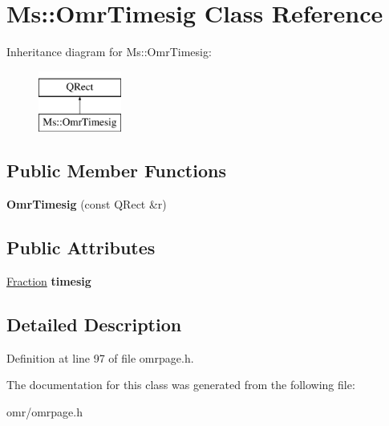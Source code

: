 \hypertarget{class_ms_1_1_omr_timesig}{}\section{Ms\+:\+:Omr\+Timesig Class Reference}
\label{class_ms_1_1_omr_timesig}
Inheritance diagram for Ms\+:\+:Omr\+Timesig\+:\begin{figure}[H]
\begin{center}
\leavevmode
\includegraphics[height=2.000000cm]{class_ms_1_1_omr_timesig}
\end{center}
\end{figure}
\subsection*{Public Member Functions}
\begin{DoxyCompactItemize}
\item 
\mbox{\label{class_ms_1_1_omr_timesig_a585056375ef320b97d6d93a4d5fec909}} 
{\bfseries Omr\+Timesig} (const Q\+Rect \&r)
\end{DoxyCompactItemize}
\subsection*{Public Attributes}
\begin{DoxyCompactItemize}
\item 
\mbox{\label{class_ms_1_1_omr_timesig_a6c6b1c6de252f75c70b98b9520ebb234}} 
\hyperlink{class_ms_1_1_fraction}{Fraction} {\bfseries timesig}
\end{DoxyCompactItemize}


\subsection{Detailed Description}


Definition at line 97 of file omrpage.\+h.



The documentation for this class was generated from the following file\+:\begin{DoxyCompactItemize}
\item 
omr/omrpage.\+h\end{DoxyCompactItemize}

